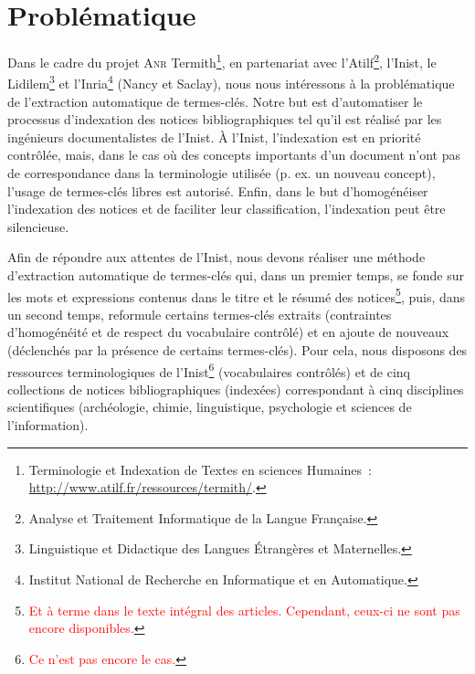     \section{Problématique}
      Dans le cadre du projet \textsc{Anr} Termith\footnote{Terminologie et
      Indexation de Textes en sciences Humaines~:
      \url{http://www.atilf.fr/ressources/termith/}.}, en partenariat avec
      l'Atilf\footnote{Analyse et Traitement Informatique de la Langue
      Française.}, l'Inist, le Lidilem\footnote{Linguistique et Didactique des
      Langues Étrangères et Maternelles.} et l'Inria\footnote{Institut National
      de Recherche en Informatique et en Automatique.} (Nancy et Saclay), nous
      nous intéressons à la problématique de l'extraction automatique de
      termes-clés. Notre but est d'automatiser le processus d'indexation des
      notices bibliographiques tel qu'il est réalisé par les ingénieurs
      documentalistes de l'Inist. À l'Inist, l'indexation est en priorité
      contrôlée, mais, dans le cas où des concepts importants d'un document
      n'ont pas de correspondance dans la terminologie utilisée (p. ex. un
      nouveau concept), l'usage de termes-clés libres est autorisé. Enfin, dans
      le but d'homogénéiser l'indexation des notices et de faciliter leur
      classification, l'indexation peut être silencieuse.

      Afin de répondre aux attentes de l'Inist, nous devons réaliser une méthode
      d'extraction automatique de termes-clés qui, dans un premier temps, se
      fonde sur les mots et expressions contenus dans le titre et le résumé des
      notices\footnote{\textcolor{red}{Et à terme dans le texte intégral des
      articles. Cependant, ceux-ci ne sont pas encore disponibles.}}, puis, dans
      un second temps, reformule certains termes-clés extraits (contraintes
      d'homogénéité et de respect du vocabulaire contrôlé) et en ajoute de
      nouveaux (déclenchés par la présence de certains termes-clés). Pour cela,
      nous disposons des ressources terminologiques de
      l'Inist\footnote{\textcolor{red}{Ce n'est pas encore le cas.}}
      (vocabulaires contrôlés) et de cinq collections de notices
      bibliographiques (indexées) correspondant à cinq disciplines scientifiques
      (archéologie, chimie, linguistique, psychologie et sciences de
      l'information).

